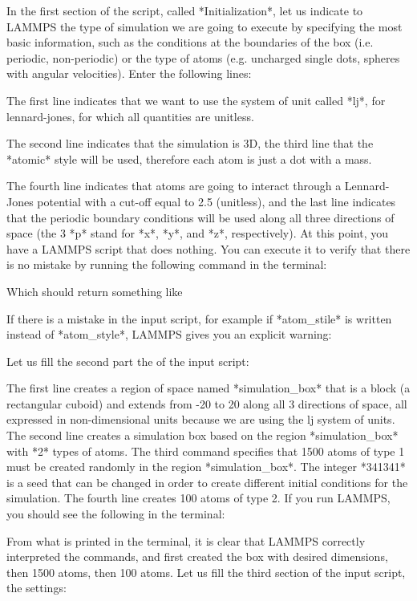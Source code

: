 In the first section of the script, called *Initialization*,
let us indicate to LAMMPS the type of simulation we are
going to execute by specifying the most basic information,
such as the conditions at the boundaries of the box (i.e.
periodic, non-periodic) or the type of atoms (e.g. uncharged
single dots, spheres with angular velocities). Enter the
following lines:

The first line indicates that we want to
use the system of unit called *lj*, for lennard-jones, for which all quantities
are unitless. 


The second line indicates that the simulation
is 3D, the third line that the *atomic* style
will be used, therefore each atom is just a dot with a mass.


The fourth line indicates that atoms are going to interact
through a Lennard-Jones potential with a cut-off equal to
2.5 (unitless), and the last line indicates that the
periodic boundary conditions will be used along all three
directions of space (the 3 *p* stand for *x*, *y*, and *z*,
respectively).
At this point, you have a LAMMPS script that does nothing.
You can execute it to verify that there is no mistake by
running the following command in the terminal:

Which should return something like

If there is a mistake in the input script, for example if
*atom_stile* is written instead of *atom_style*, LAMMPS
gives you an explicit warning:

Let us fill the second part the of the input script:

The first line creates a region of space
named *simulation_box* that is a block (a rectangular cuboid) and
extends from -20 to 20 along all 3 directions of space, all expressed in
non-dimensional units because we are using the lj system
of units. The second line creates a simulation box based on
the region *simulation_box* with *2* types of atoms. The third
command specifies that 1500 atoms of type 1 must be created
randomly in the region *simulation_box*. The integer *341341* is a
seed that can be changed in order to create different
initial conditions for the simulation. The fourth line
creates 100 atoms of type 2.
If you run LAMMPS, you should see the following in the
terminal:

From what is printed in the terminal, it is clear that
LAMMPS correctly interpreted the commands, and first created
the box with desired dimensions, then 1500 atoms, then 100
atoms.
Let us fill the third section of the input script, the settings:

